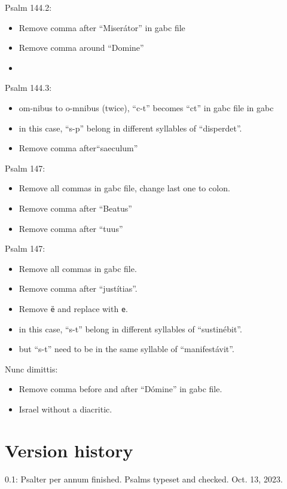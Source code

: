 \documentclass[11pt]{article}
\begin{document}
 Psalm 144.2:
  \begin{itemize}
      \item Remove comma after ``Miserátor'' in gabc file
  \item Remove comma around ``Domine''
  \item  
    \end{itemize}

 Psalm 144.3:
  \begin{itemize}
  \item om-nibus to o-mnibus (twice),  ``c-t'' becomes ``ct'' in gabc file in gabc
     \item in this case, ``s-p'' belong in different syllables of ``disperdet''.
  \item  Remove comma after``saeculum''
    \end{itemize}

 Psalm 147:
  \begin{itemize}
    \item Remove all commas in gabc file, change last one to colon.
      \item Remove comma after ``Beatus''
        \item Remove comma after ``tuus''
      \end{itemize}
  
    Psalm 147:
  \begin{itemize}
      \item Remove all commas in gabc file.
          \item Remove comma after ``justítias''.
    \item Remove \texttt{ë} and replace with \texttt{e}.
    \item in this case, ``s-t'' belong in different syllables of ``sustinébit''.
    \item but ``s-t'' need to be in the same syllable of ``manifestávit''.
  
    \end{itemize}
    
    Nunc dimittis:
    
      \begin{itemize}
  \item Remove comma before and after ``Dómine'' in gabc file.
  \item Israel without a diacritic.
  \end{itemize}
  
  \section{Version history}
0.1: Psalter per annum finished. Psalms typeset and checked. Oct. 13, 2023.
\end{document}
